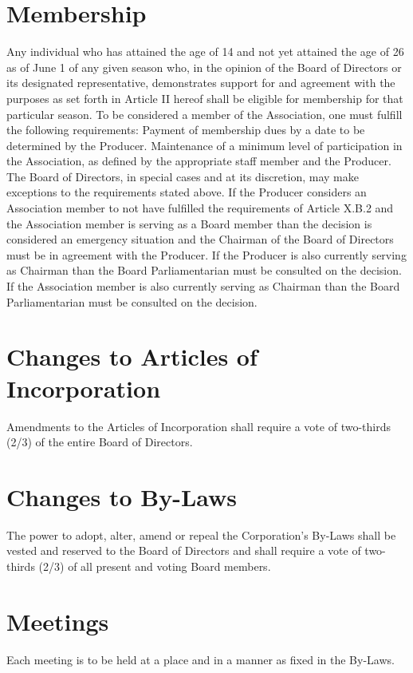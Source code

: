 \documentclass{wst}
\begin{document}
\section{Membership}
\begin{outline}[enumerate]
\1 Any individual who has attained the age of 14 and not yet attained the age of 26 as of June 1 of any given season who, in the opinion of the Board of Directors or its designated representative, demonstrates support for and agreement with the purposes as set forth in Article II hereof shall be eligible for membership for that particular season.
\1 To be considered a member of the Association, one must fulfill the following requirements:
\2 Payment of membership dues by a date to be determined by the Producer.
\2 Maintenance of a minimum level of participation in the Association, as defined by the appropriate staff member and the Producer.
\1 The Board of Directors, in special cases and at its discretion, may make exceptions to the requirements stated above.
\1 If the Producer considers an Association member to not have fulfilled the requirements of Article X.B.2 and the Association member is serving as a Board member than the decision is considered an emergency situation and the Chairman of the Board of Directors must be in agreement with the Producer.  If the Producer is also currently serving as Chairman than the Board Parliamentarian must be consulted on the decision.  If the Association member is also currently serving as Chairman than the Board Parliamentarian must be consulted on the decision.
\end{outline}

\section{Changes to Articles of Incorporation}
Amendments to the Articles of Incorporation shall require a vote of two-thirds (2/3) of the entire Board of Directors.

\section{Changes to By-Laws}
The power to adopt, alter, amend or repeal the Corporation’s By-Laws shall be vested and reserved to the Board of Directors and shall require a vote of two-thirds (2/3) of all present and voting Board members.

\section{Meetings}
Each meeting is to be held at a place and in a manner as fixed in the By-Laws.
\end{document}
